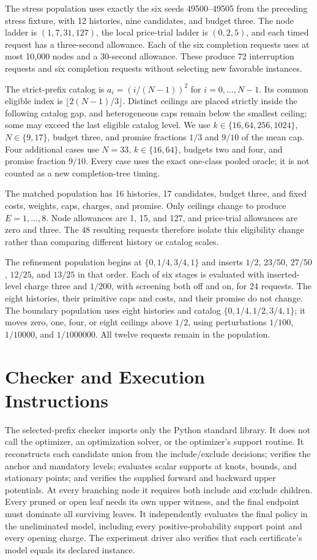The stress population uses exactly the six seeds 49500--49505 from the preceding stress fixture, with 12 histories, nine candidates, and budget three. The node ladder is $(1,7,31,127)$, the local price-trial ladder is $(0,2,5)$, and each timed request has a three-second allowance. Each of the six completion requests uses at most 10,000 nodes and a 30-second allowance. These produce 72 interruption requests and six completion requests without selecting new favorable instances.

The strict-prefix catalog is $a_i=(i/(N-1))^2$ for $i=0,\ldots,N-1$. Its common eligible index is $\lfloor2(N-1)/3\rfloor$. Distinct ceilings are placed strictly inside the following catalog gap, and heterogeneous caps remain below the smallest ceiling; some may exceed the last eligible catalog level. We use $k\in\{16,64,256,1024\}$, $N\in\{9,17\}$, budget three, and promise fractions $1/3$ and $9/10$ of the mean cap. Four additional cases use $N=33$, $k\in\{16,64\}$, budgets two and four, and promise fraction $9/10$. Every case uses the exact one-class pooled oracle; it is not counted as a new completion-tree timing.

The matched population has 16 histories, 17 candidates, budget three, and fixed costs, weights, caps, charges, and promise. Only ceilings change to produce $E=1,\ldots,8$. Node allowances are 1, 15, and 127, and price-trial allowances are zero and three. The 48 resulting requests therefore isolate this eligibility change rather than comparing different history or catalog scales.

The refinement population begins at $\{0,1/4,3/4,1\}$ and inserts $1/2$, $23/50$, $27/50$, $12/25$, and $13/25$ in that order. Each of six stages is evaluated with inserted-level charge three and $1/200$, with screening both off and on, for 24 requests. The eight histories, their primitive caps and costs, and their promise do not change. The boundary population uses eight histories and catalog $\{0,1/4,1/2,3/4,1\}$; it moves zero, one, four, or eight ceilings above $1/2$, using perturbations $1/100$, $1/10000$, and $1/1000000$. All twelve requests remain in the population.

\section{Checker and Execution Instructions}\label{sec:r51-checker}
The selected-prefix checker imports only the Python standard library. It does not call the optimizer, an optimization solver, or the optimizer's support routine. It reconstructs each candidate union from the include/exclude decisions; verifies the anchor and mandatory levels; evaluates scalar supports at knots, bounds, and stationary points; and verifies the supplied forward and backward upper potentials. At every branching node it requires both include and exclude children. Every pruned or open leaf needs its own upper witness, and the final endpoint must dominate all surviving leaves. It independently evaluates the final policy in the uneliminated model, including every positive-probability support point and every opening charge. The experiment driver also verifies that each certificate's model equals its declared instance.

